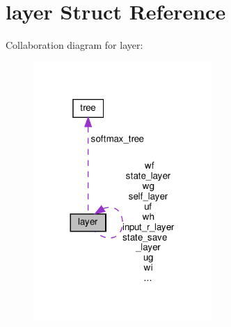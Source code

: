 \hypertarget{structlayer}{}\section{layer Struct Reference}
\label{structlayer}


Collaboration diagram for layer\+:
\nopagebreak
\begin{figure}[H]
\begin{center}
\leavevmode
\includegraphics[width=192pt]{structlayer__coll__graph}
\end{center}
\end{figure}
